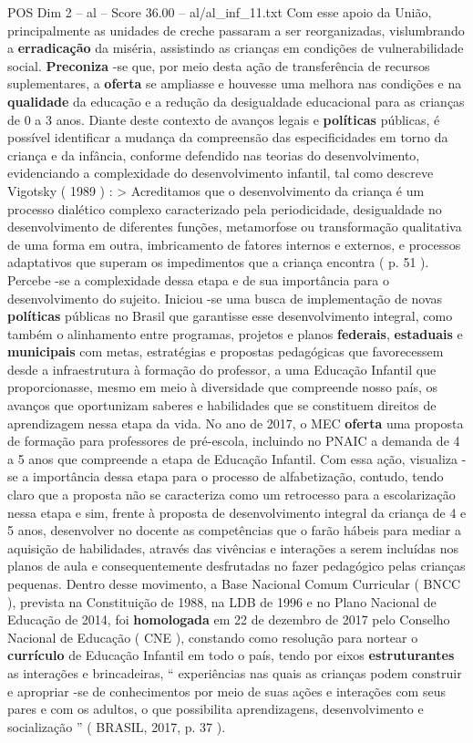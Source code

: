 \begin{textsample}{POS Dim 2 – al – Score 36.00 – al/al\_inf\_11.txt}
Com esse apoio da União, principalmente as unidades de creche passaram a ser reorganizadas, vislumbrando a \textbf{erradicação} da miséria, assistindo as crianças em condições de vulnerabilidade social. \textbf{Preconiza} -se que, por meio desta ação de transferência de recursos suplementares, a \textbf{oferta} se ampliasse e houvesse uma melhora nas condições e na \textbf{qualidade} da educação e a redução da desigualdade educacional para as crianças de 0 a 3 anos.
Diante deste contexto de avanços legais e \textbf{políticas} públicas, é possível identificar a mudança da compreensão das especificidades em torno da criança e da infância, conforme defendido nas teorias do desenvolvimento, evidenciando a complexidade do desenvolvimento infantil, tal como descreve Vigotsky ( 1989 ) : > Acreditamos que o desenvolvimento da criança é um processo dialético complexo caracterizado pela periodicidade, desigualdade no desenvolvimento de diferentes funções, metamorfose ou transformação qualitativa de uma forma em outra, imbricamento de fatores internos e externos, e processos adaptativos que superam os impedimentos que a criança encontra ( p. 51 ).
Percebe -se a complexidade dessa etapa e de sua importância para o desenvolvimento do sujeito.
Iniciou -se uma busca de implementação de novas \textbf{políticas} públicas no Brasil que garantisse esse desenvolvimento integral, como também o alinhamento entre programas, projetos e planos \textbf{federais}, \textbf{estaduais} e \textbf{municipais} com metas, estratégias e propostas pedagógicas que favorecessem desde a infraestrutura à formação do professor, a uma Educação Infantil que proporcionasse, mesmo em meio à diversidade que compreende nosso país, os avanços que oportunizam saberes e habilidades que se constituem direitos de aprendizagem nessa etapa da vida.
No ano de 2017, o MEC \textbf{oferta} uma proposta de formação para professores de pré-escola, incluindo no PNAIC a demanda de 4 a 5 anos que compreende a etapa de Educação Infantil.
Com essa ação, visualiza -se a importância dessa etapa para o processo de alfabetização, contudo, tendo claro que a proposta não se caracteriza como um retrocesso para a escolarização nessa etapa e sim, frente à proposta de desenvolvimento integral da criança de 4 e 5 anos, desenvolver no docente as competências que o farão hábeis para mediar a aquisição de habilidades, através das vivências e interações a serem incluídas nos planos de aula e consequentemente desfrutadas no fazer pedagógico pelas crianças pequenas.
Dentro desse movimento, a Base Nacional Comum Curricular ( BNCC ), prevista na Constituição de 1988, na LDB de 1996 e no Plano Nacional de Educação de 2014, foi \textbf{homologada} em 22 de dezembro de 2017 pelo Conselho Nacional de Educação ( CNE ), constando como resolução para nortear o \textbf{currículo} de Educação Infantil em todo o país, tendo por eixos \textbf{estruturantes} as interações e brincadeiras, “ experiências nas quais as crianças podem construir e apropriar -se de conhecimentos por meio de suas ações e interações com seus pares e com os adultos, o que possibilita aprendizagens, desenvolvimento e socialização ” ( BRASIL, 2017, p. 37 ).

\end{textsample}
